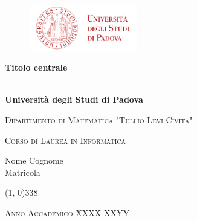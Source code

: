 
\begin{titlepage} 

\begin{figure}[htbp]
\flushright
\includegraphics[height=2cm]{img/log_uni}
\end{figure}

\begin{center}
\begin{vplace}
\begin{LARGE}
\begin{center}
\textbf{Titolo centrale} \\
\vspace{20pt}
\textbf{\color{Maroon}{Titolo relazione}} \\



\vspace{150pt}

\end{center}
\end{LARGE}
\begin{LARGE}
\textbf{Università degli Studi di Padova} \\
\end{LARGE}


\vspace{8pt}

\begin{Large}
\textsc{Dipartimento di Matematica "Tullio Levi-Civita"} \\
\end{Large}

\vspace{8pt}

\begin{large}
\textsc{Corso di Laurea in Informatica}\\
\end{large}

\begin{large}
Nome Cognome \\
Matricola
\end{large}

\end{vplace}

\line(1, 0){338} \\

\vspace{10pt}

\begin{normalsize}
\textsc{Anno Accademico XXXX-XXYY}
\end{normalsize}

\end{center}
\end{titlepage} 
